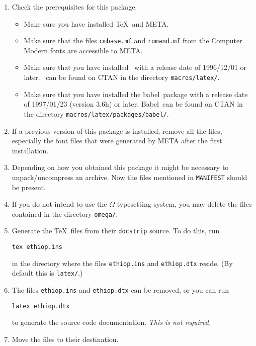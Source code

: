 \documentclass[a4paper]{article}
\newcommand*\MF{{\manual META}\-{\manual FONT}}
\newcommand*\babel{\textsf{babel}}
\newcommand*\Babel{\textsf{Babel}}
\begin{document}
\begin{enumerate}
\item Check the prerequisites for this package.

\begin{itemize}
\item Make sure you have installed \TeX\ and \MF.
\item Make sure that the files \texttt{cmbase.mf} and \texttt{romand.mf}
from the Computer Modern fonts are accessible to \MF.
\item Make sure that you have installed \LaTeXe\ with
a release date of 1996/12/01 or later. \LaTeXe\
can be found on CTAN in the directory \texttt{macros/latex/}.
\item Make sure that you have installed the \babel\ package with
a release date of 1997/01/23 (version 3.6h) or later. \Babel\
can be found on CTAN in the directory \texttt{macros/latex/packages/babel/}.
\end{itemize}

\item If a previous version of this package is installed, remove
all the files, especially the font files that were generated 
by \MF{} after the first installation.

\item Depending on how you obtained this package it might be
necessary to unpack/uncompress an archive. Now the files mentioned
in \texttt{MANIFEST} should be present.

\item If you do not intend to use the $\Omega$ typesetting system,
you may delete the files contained in the directory \texttt{omega/}.

\item Generate the \TeX\ files from their \texttt{docstrip}
source. To do this, run
\begin{verbatim}
tex ethiop.ins
\end{verbatim}
in the directory where the files \texttt{ethiop.ins} and
\texttt{ethiop.dtx} reside. (By default this is \texttt{latex/}.)

\item The files \texttt{ethiop.ins} and \texttt{ethiop.dtx}
can be removed, or you can run
\begin{verbatim}
latex ethiop.dtx
\end{verbatim}
to generate the source code documentation. \textit{This is not
required.}

\item Move the files to their destination.


\end{enumerate}
\end{document}

